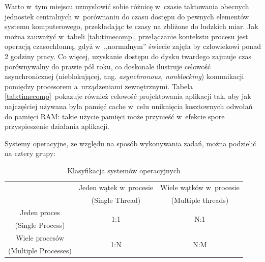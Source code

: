 \documentclass[11pt,makeidx]{mwart}
\begin{document}
	Warto w~tym miejscu uzmysłowić sobie różnicę w~czasie taktowania obecnych jednostek centralnych w~porównaniu do czasu dostępu do pewnych
	elementów systemu komputerowego, przekładając te czasy na zbliżone do ludzkich miar. Jak można zauważyć w~tabeli \ref{tab:timecomp},
	przełączanie kontekstu procesu jest operacją czasochłonną, gdyż w~,,normalnym'' świecie zajęła by człowiekowi ponad 2 godziny pracy.
	Co więcej, uzyskanie dostępu do dysku twardego zajmuje czas porównywalny do prawie pół roku, co doskonale ilustruje celowość asynchronicznej
	(nieblokującej, ang. \emph{asynchronous, non\dywiz{}blocking}) komunikacji pomiędzy procesorem a~urządzeniami zewnętrznymi.
	Tabela \ref{tab:timecomp}~pokazuje również celowość projektowania aplikacji tak, aby jak najczęściej używana była pamięć cache w~celu uniknięcia
	kosztownych odwołań do pamięci RAM: takie użycie pamięci może przynieść w~efekcie spore przyspieszenie działania aplikacji.
\par
%
\indent
	Systemy operacyjne, ze względu na sposób wykonywania zadań, można podzielić na cztery grupy:
	\begin{table}[h]
	\centering
	\begin{tabular}{|c|c|c|} \hline
													 & Jeden wątek w~procesie   	 & Wiele wątków w~procesie \\
													 & (Single Thread)          	 & (Multiple threads)      \\\hline
			Jeden proces         & \multirow{2}{*}{1:1} 	     & \multirow{2}{*}{N:1}	 \\
			(Single Process)     &  										   		 &  									     \\\hline
			Wiele procesów       & \multirow{2}{*}{1:N}       & \multirow{2}{*}{N:M}   \\
			(Multiple Processes) &                             &                         \\\hline
	\end{tabular}\\
	\caption{Klasyfikacja systemów operacyjnych}
	\end{table}
\par
%
\end{document}
